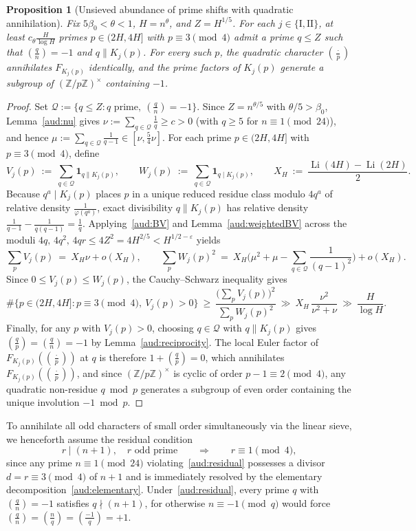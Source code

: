 \documentclass[11pt, a4paper]{article}
\theoremstyle{plain}
\newtheorem{proposition}[theorem]{Proposition}
\theoremstyle{definition}
\newcommand{\Z}{\mathbb{Z}}
\newcommand{\ind}{\mathbf{1}}
\newcommand{\leg}[2]{\left(\frac{#1}{#2}\right)}
\newcommand{\I}{\mathrm{I}}
\newcommand{\II}{\mathrm{II}}
\DeclareMathOperator{\Li}{Li}
\begin{document}
\begin{proposition}[Unsieved abundance of prime shifts with quadratic annihilation]\label{aud:unsieved}
Fix $5\beta_0<\theta<1$, $H=n^{\theta}$, and $Z=H^{1/5}$. For each $j\in\{\I,\II\}$, at least $c_{\theta}\frac{H}{\log H}$ primes $p\in(2H,4H]$ with $p\equiv3\pmod 4$ admit a prime $q\le Z$ such that $\leg{q}{n}=-1$ and $q\parallel K_j(p)$. For every such $p$, the quadratic character $\leg{\cdot}{p}$ annihilates $F_{K_j(p)}$ identically, and the prime factors of $K_j(p)$ generate a subgroup of $(\Z/p\Z)^{\times}$ containing $-1$.
\end{proposition}
\begin{proof}
Set $\mathcal{Q}:=\{q\le Z:q\text{ prime},\ \leg{q}{n}=-1\}$. Since $Z=n^{\theta/5}$ with $\theta/5>\beta_0$, Lemma~\ref{aud:nu} gives $\nu:=\sum_{q\in\mathcal{Q}}\frac1q\ge c>0$ (with $q\ge5$ for $n\equiv 1\pmod{24}$), and hence $\mu:=\sum_{q\in\mathcal{Q}}\frac{1}{q-1}\in[\nu,\frac54\nu]$. For each prime $p\in(2H,4H]$ with $p\equiv3\pmod 4$, define
\[
V_j(p)\ :=\ \sum_{q\in\mathcal{Q}}\ind_{q\parallel K_j(p)},\qquad W_j(p)\ :=\ \sum_{q\in\mathcal{Q}}\ind_{q\mid K_j(p)},\qquad X_H\ :=\ \frac{\Li(4H)-\Li(2H)}{2}.
\]
Because $q^{a}\mid K_j(p)$ places $p$ in a unique reduced residue class modulo $4q^{a}$ of relative density $\frac{1}{\varphi(q^{a})}$, exact divisibility $q\parallel K_j(p)$ has relative density $\frac{1}{q-1}-\frac{1}{q(q-1)}=\frac1q$. Applying~\eqref{aud:BV} and Lemma~\ref{aud:weightedBV} across the moduli $4q,\,4q^{2},\,4qr\le 4Z^{2}=4H^{2/5}<H^{1/2-\varepsilon}$ yields
\[
\sum_p V_j(p)\ =\ X_H\nu+o(X_H),\qquad \sum_p W_j(p)^{2}\ =\ X_H\Big(\mu^{2}+\mu-\sum_{q\in\mathcal{Q}}\frac{1}{(q-1)^{2}}\Big)+o(X_H).
\]
Since $0\le V_j(p)\le W_j(p)$, the Cauchy--Schwarz inequality gives
\[
\#\big\{p\in(2H,4H]:p\equiv 3\pmod 4,\ V_j(p)>0\big\}\ \ge\ \frac{\big(\sum_p V_j(p)\big)^{2}}{\sum_p W_j(p)^{2}}\ \gg\ X_H\,\frac{\nu^{2}}{\nu^{2}+\nu}\ \gg\ \frac{H}{\log H}.
\]
Finally, for any $p$ with $V_j(p)>0$, choosing $q\in\mathcal{Q}$ with $q\parallel K_j(p)$ gives $\leg{q}{p}=\leg{q}{n}=-1$ by Lemma~\ref{aud:reciprocity}. The local Euler factor of $F_{K_j(p)}(\leg{\cdot}{p})$ at $q$ is therefore $1+\leg{q}{p}=0$, which annihilates $F_{K_j(p)}(\leg{\cdot}{p})$, and since $(\Z/p\Z)^{\times}$ is cyclic of order $p-1\equiv2\pmod 4$, any quadratic non-residue $q\bmod p$ generates a subgroup of even order containing the unique involution $-1\bmod p$.
\end{proof}

To annihilate all odd characters of small order simultaneously via the linear sieve, we henceforth assume the residual condition
\begin{equation}\label{aud:residual}
r\mid(n+1),\quad r\text{ odd prime}\qquad\Longrightarrow\qquad r\equiv1\pmod 4, \tag{R}
\end{equation}
since any prime $n\equiv1\pmod{24}$ violating~\eqref{aud:residual} possesses a divisor $d=r\equiv 3\pmod 4$ of $n+1$ and is immediately resolved by the elementary decomposition~\eqref{aud:elementary}. Under~\eqref{aud:residual}, every prime $q$ with $\leg{q}{n}=-1$ satisfies $q\nmid(n+1)$, for otherwise $n\equiv -1\pmod q$ would force $\leg{q}{n}=\leg{n}{q}=\leg{-1}{q}=+1$.
\end{document}
